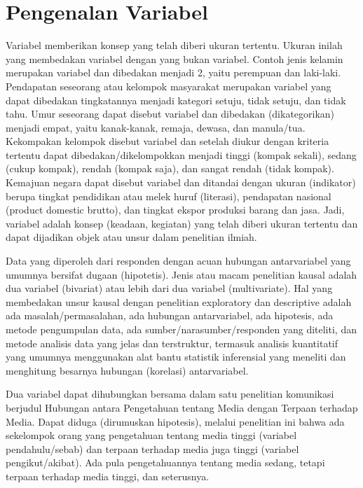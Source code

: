 

\section{Pengenalan Variabel}
Variabel memberikan konsep yang telah diberi ukuran tertentu. Ukuran inilah yang membedakan variabel dengan yang bukan variabel. 
Contoh jenis kelamin merupakan variabel dan dibedakan menjadi 2, yaitu perempuan dan laki-laki. Pendapatan seseorang atau 
kelompok masyarakat merupakan variabel yang dapat dibedakan tingkatannya menjadi kategori setuju, tidak setuju, dan tidak tahu. 
Umur seseorang dapat disebut variabel dan dibedakan (dikategorikan) menjadi empat, yaitu kanak-kanak, remaja, dewasa, dan 
manula/tua. Kekompakan kelompok disebut variabel dan setelah diukur dengan kriteria tertentu dapat dibedakan/dikelompokkan 
menjadi tinggi (kompak sekali), sedang (cukup kompak), rendah (kompak saja), dan sangat rendah (tidak kompak). Kemajuan negara 
dapat disebut variabel dan ditandai dengan ukuran (indikator) berupa tingkat pendidikan atau melek huruf (literasi), pendapatan 
nasional (product domestic brutto), dan tingkat ekspor produksi barang dan jasa. Jadi, variabel adalah konsep (keadaan, 
kegiatan) yang telah diberi ukuran tertentu dan dapat dijadikan objek atau unsur dalam penelitian ilmiah.

Data yang diperoleh dari responden dengan acuan hubungan antarvariabel yang umumnya bersifat dugaan (hipotetis). Jenis atau 
macam penelitian kausal adalah dua variabel (bivariat) atau lebih dari dua variabel (multivariate). Hal yang membedakan unsur 
kausal dengan penelitian exploratory dan descriptive adalah ada masalah/permasalahan, ada hubungan antarvariabel, ada hipotesis, 
ada metode pengumpulan data, ada sumber/narasumber/responden yang diteliti, dan metode analisis data yang jelas dan terstruktur, 
termasuk analisis kuantitatif yang umumnya menggunakan alat bantu statistik inferensial yang meneliti dan menghitung besarnya 
hubungan (korelasi) antarvariabel.

Dua variabel dapat dihubungkan bersama dalam satu penelitian komunikasi berjudul Hubungan antara Pengetahuan tentang Media 
dengan Terpaan terhadap Media. Dapat diduga (dirumuskan hipotesis), melalui penelitian ini bahwa ada sekelompok orang yang 
pengetahuan tentang media tinggi (variabel pendahulu/sebab) dan terpaan terhadap media juga tinggi (variabel pengikut/akibat). 
Ada pula pengetahuannya tentang media sedang, tetapi terpaan terhadap media tinggi, dan seterusnya. 

